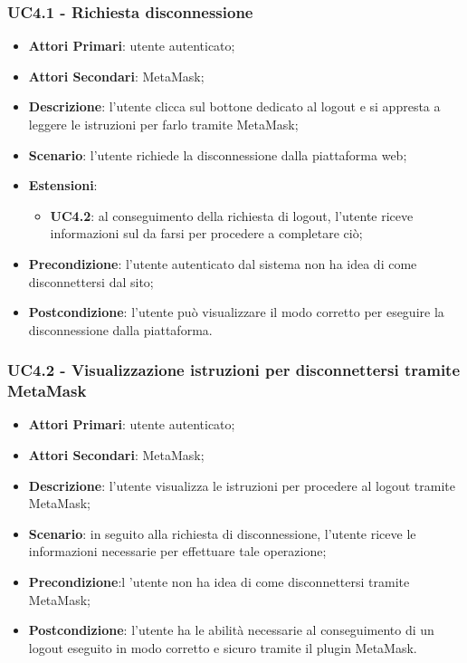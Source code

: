\subsubsection{UC4.1 - Richiesta disconnessione}
\begin{itemize}
	\item \textbf{Attori Primari}:
	utente autenticato;
	\item \textbf{Attori Secondari}:
	MetaMask\glo;
	\item \textbf{Descrizione}: l'utente clicca sul bottone dedicato al logout e si appresta a leggere le istruzioni per farlo tramite MetaMask\glo;
	\item \textbf{Scenario}: l'utente richiede la disconnessione dalla piattaforma web;
	\item \textbf{Estensioni}:
	\begin{itemize}
		\item \textbf{UC4.2}: al conseguimento della richiesta di logout, l'utente riceve informazioni sul da farsi per procedere a completare ciò;
	\end{itemize}
	\item \textbf{Precondizione}: l'utente autenticato dal sistema non ha idea di come disconnettersi dal sito;
	\item \textbf{Postcondizione}: l'utente può visualizzare il modo corretto per eseguire la disconnessione dalla piattaforma.
	
\end{itemize}
\subsubsection{UC4.2 - Visualizzazione istruzioni per disconnettersi tramite MetaMask\glo}
\begin{itemize}
	\item \textbf{Attori Primari}:
	utente autenticato;
	\item \textbf{Attori Secondari}:
	MetaMask\glo;
	\item \textbf{Descrizione}: l'utente visualizza le istruzioni per procedere al logout tramite MetaMask\glo;
	\item \textbf{Scenario}: in seguito alla richiesta di disconnessione, l'utente riceve le informazioni necessarie per effettuare tale operazione;
	\item \textbf{Precondizione}:l 'utente non ha idea di come disconnettersi tramite MetaMask\glo;
	\item \textbf{Postcondizione}: l'utente ha le abilità necessarie al conseguimento di un logout eseguito in modo corretto e sicuro tramite il plugin MetaMask\glo.
\end{itemize}

